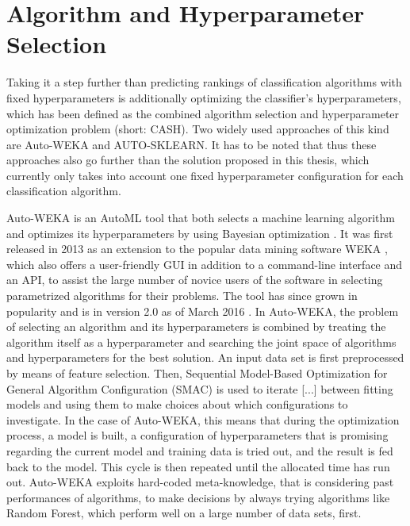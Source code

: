 \section{Algorithm and Hyperparameter Selection}
\label{sec:related:cash}
Taking it a step further than predicting rankings of classification algorithms with fixed hyperparameters is additionally optimizing the classifier's hyperparameters, which has been defined as \textquotesingle the combined algorithm selection and hyperparameter optimization problem (short: CASH)\textquotesingle \cite{thornton2013auto}. Two widely used approaches of this kind are Auto-WEKA and AUTO-SKLEARN. It has to be noted that thus these approaches also go further than the solution proposed in this thesis, which currently only takes into account one fixed hyperparameter configuration for each classification algorithm. 

Auto-WEKA is an AutoML tool that both selects a machine learning algorithm and optimizes its hyperparameters by using Bayesian optimization \cite{thornton2013auto}. It was first released in 2013 as an extension to the popular data mining software WEKA \cite{hall2009weka}, which also offers a user-friendly GUI in addition to a command-line interface and an API, to assist the large number of novice users of the software in selecting parametrized algorithms for their problems. The tool has since grown in popularity and is in version 2.0 as of March 2016 \cite{kotthoff2016auto}. In Auto-WEKA, the problem of selecting an algorithm and its hyperparameters is combined by treating the algorithm itself as a hyperparameter and searching the joint space of algorithms and hyperparameters for the best solution. An input data set is first preprocessed by means of feature selection. Then, Sequential Model-Based Optimization for General Algorithm Configuration (SMAC) is used to \textquotesingle iterate [...] between fitting models and using them to make choices about which configurations to investigate\textquotesingle  \cite{hutter2011sequential}. In the case of Auto-WEKA, this means that during the optimization process, a model is built, a configuration of hyperparameters that is promising regarding the current model and training data is tried out, and the result is fed back to the model. This cycle is then repeated until the allocated time has run out. Auto-WEKA exploits hard-coded meta-knowledge, that is considering past performances of algorithms, to make decisions by always trying algorithms like Random Forest, which perform well on a large number of data sets, first. \\

